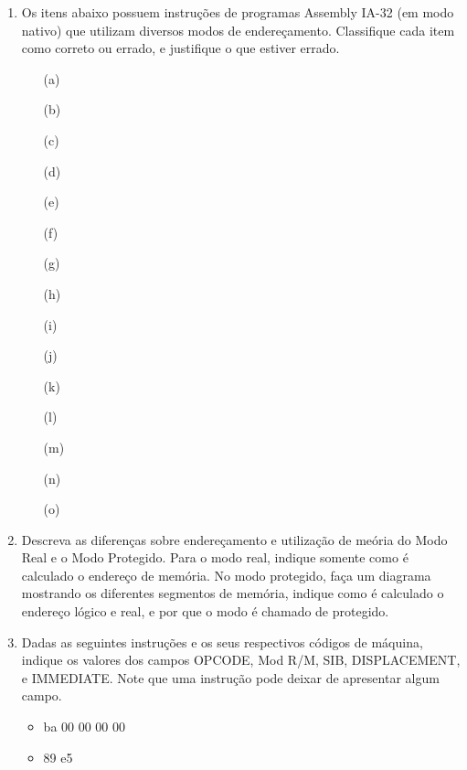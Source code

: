 \begin{enumerate}
    \item
    Os itens abaixo possuem instruções de programas Assembly IA-32 (em modo nativo) 
    que utilizam diversos modos de endereçamento. 
    Classifique cada item como correto ou errado, e justifique o que estiver errado.
    \begin{itemize}
        \item[(a)] 
        \item[(b)] 
        \item[(c)] 
        \item[(d)] 
        \item[(e)] 
        \item[(f)] 
        \item[(g)] 
        \item[(h)] 
        \item[(i)] 
        \item[(j)]  
        \item[(k)] 
        \item[(l)] 
        \item[(m)] 
        \item[(n)] 
        \item[(o)] 
    \end{itemize}

    \item
    Descreva as diferenças sobre endereçamento e utilização de meória 
    do Modo Real e o Modo Protegido. 
    Para o modo real, indique somente como é calculado o endereço de memória.
    No modo protegido, 
    faça um diagrama mostrando os diferentes segmentos de memória,
    indique como é calculado o endereço lógico e real, 
    e por que o modo é chamado de protegido.

    \item 
    Dadas as seguintes instruções e os seus respectivos códigos de máquina,
    indique os valores dos campos OPCODE, Mod R/M, SIB, DISPLACEMENT, e IMMEDIATE.
    Note que uma instrução pode deixar de apresentar algum campo.
    \begin{itemize}
        \item {} ba 00 00 00 00
        \item {} 89 e5
    \end{itemize}


\end{enumerate}
